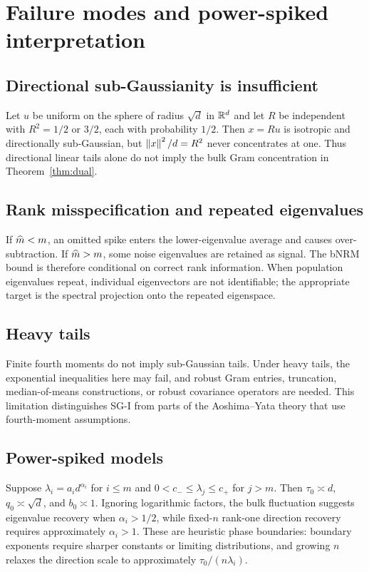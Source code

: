 \section{Failure modes and power-spiked interpretation}\label{sec:boundaries}
\subsection{Directional sub-Gaussianity is insufficient}
Let $u$ be uniform on the sphere of radius $\sqrt d$ in $\mathbb{R}^d$ and let $R$ be independent with $R^2=1/2$ or $3/2$, each with probability $1/2$.  Then $x=Ru$ is isotropic and directionally sub-Gaussian, but $\left\lVert x\right\rVert^2/d=R^2$ never concentrates at one.  Thus directional linear tails alone do not imply the bulk Gram concentration in Theorem~\ref{thm:dual}.

\subsection{Rank misspecification and repeated eigenvalues}
If $\widehat{m}<m$, an omitted spike enters the lower-eigenvalue average and causes over-subtraction.  If $\widehat{m}>m$, some noise eigenvalues are retained as signal.  The bNRM bound is therefore conditional on correct rank information.  When population eigenvalues repeat, individual eigenvectors are not identifiable; the appropriate target is the spectral projection onto the repeated eigenspace.

\subsection{Heavy tails}
Finite fourth moments do not imply sub-Gaussian tails.  Under heavy tails, the exponential inequalities here may fail, and robust Gram entries, truncation, median-of-means constructions, or robust covariance operators are needed.  This limitation distinguishes SG-I from parts of the Aoshima--Yata theory that use fourth-moment assumptions.

\subsection{Power-spiked models}
Suppose $\lambda_i=a_id^{\alpha_i}$ for $i\le m$ and $0<c_-\le\lambda_j\le c_+$ for $j>m$.  Then $\tau_0\asymp d$, $q_0\asymp\sqrt d$, and $b_0\asymp1$.  Ignoring logarithmic factors, the bulk fluctuation suggests eigenvalue recovery when $\alpha_i>1/2$, while fixed-$n$ rank-one direction recovery requires approximately $\alpha_i>1$.  These are heuristic phase boundaries: boundary exponents require sharper constants or limiting distributions, and growing $n$ relaxes the direction scale to approximately $\tau_0/(n\lambda_i)$.
